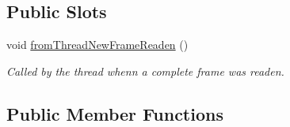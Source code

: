 \subsection*{Public Slots}
\begin{DoxyCompactItemize}
\item 
void \hyperlink{classmdt_usbtmc_port_manager_aca42b343ae1f6a324e6e45968f03bbea}{fromThreadNewFrameReaden} ()
\begin{DoxyCompactList}\small\item\em Called by the thread whenn a complete frame was readen. \end{DoxyCompactList}\end{DoxyCompactItemize}
\subsection*{Public Member Functions}
